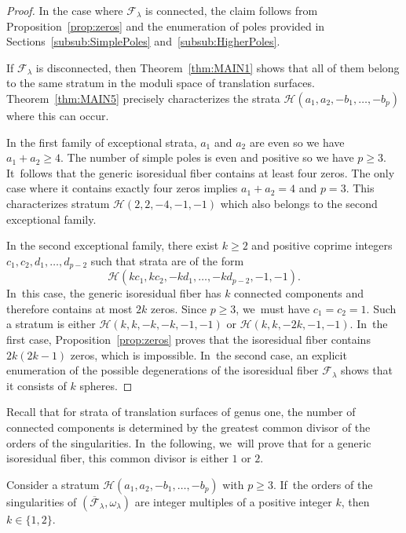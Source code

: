 \begin{proof}
In the case where $\mathcal{F}_{\lambda}$ is connected, the claim follows from Proposition~\ref{prop:zeros} and the enumeration of poles provided in Sections~\ref{subsub:SimplePoles} and~\ref{subsub:HigherPoles}.

If $\mathcal{F}_{\lambda}$ is disconnected, then Theorem~\ref{thm:MAIN1} shows that all of them belong to the same stratum in the moduli space of translation surfaces. Theorem~\ref{thm:MAIN5} precisely characterizes the strata $\mathcal{H}(a_{1},a_{2},-b_{1},\dots,-b_{p})$ where this can occur.

In the first family of exceptional strata, $a_{1}$ and $a_{2}$ are even so we have \hbox{$a_{1}\!+\!a_{2}\!\geq\! 4$}. The number of simple poles is even and positive so we have $p \geq 3$. It~follows that the generic isoresidual fiber contains at least four zeros. The only case where it contains exactly four zeros implies $a_{1}+a_{2}=4$ and $p=3$. This characterizes stratum $\mathcal{H}(2,2,-4,-1,-1)$ which also belongs to the second exceptional family.

In the second exceptional family, there exist $k \geq 2$ and positive coprime integers $c_{1},c_{2},d_{1},\dots,d_{p-2}$ such that strata are of the form
\[
\mathcal{H}(kc_{1},kc_{2},-kd_{1},\dots,-kd_{p-2},-1,-1).
\]
In~this case, the generic isoresidual fiber has $k$ connected components and therefore contains at most $2k$ zeros. Since $p \geq 3$, we~must have $c_{1}=c_{2}=1$. Such a stratum is either $\mathcal{H}(k,k,-k,-k,-1,-1)$ or $\mathcal{H}(k,k,-2k,-1,-1)$. In~the first case, Proposition~\ref{prop:zeros} proves that the isoresidual fiber contains $2k(2k-1)$ zeros, which is impossible. In~the second case, an explicit enumeration of the possible degenerations of the isoresidual fiber $\mathcal F_\lambda$ shows that it consists of $k$ spheres.
\end{proof}

Recall that for strata of translation surfaces of genus one, the number of connected components is determined by the greatest common divisor of the orders of the singularities. In~the following, we~will prove that for a generic isoresidual fiber, this common divisor is either $1$ or $2$.

\begin{prop}\label{prop:Factor}
Consider a stratum $\mathcal{H}(a_{1},a_{2},-b_{1},\dots,-b_{p})$ with $p \geq 3$. If~the orders of the singularities of $(\overline{\mathcal{F}}_{\lambda},\omega_{\lambda})$ are integer multiples of a positive integer $k$, then $k \in \lbrace{ 1,2 \rbrace}$.
\end{prop}

